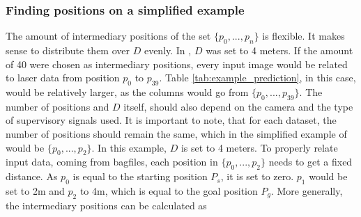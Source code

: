 \begin{table}[h]
\caption{Simplified dataset output}
\label{tab:example_prediction}
\end{table}



\subsubsection{Finding positions on a simplified example \label{finding_positions} }
The amount of intermediary positions of the set $\{p_{0},...,p_{n}\}$ is flexible. It makes sense to distribute them over $D$ evenly. In , $D$ was set to 4 meters. If the amount of 40 were chosen as intermediary positions, every input image would be related to laser data from position $p_{0}$ to $p_{39}$. Table \ref{tab:example_prediction}, in this case, would be relatively larger, as the columns would go from $\{p_{0},...,p_{39}\}$. The number of positions and $ D $ itself, should also depend on the camera and the type of supervisory signals used. It is important to note, that for each dataset, the number of positions should remain the same, which in the simplified example of  would be $\{p_{0},...,p_{2}\}$. In this example, $D$ is set to 4 meters. To properly relate input data, coming from bagfiles, each position in $\{p_{0},...,p_{2}\}$ needs to get a fixed distance. As $p_{0}$ is equal to the starting position $P_{s}$, it is set to zero. $p_{1}$ would be set to 2m and $p_{2}$ to 4m, which is equal to the goal position $P_{g}$. More generally, the intermediary positions can be calculated as

